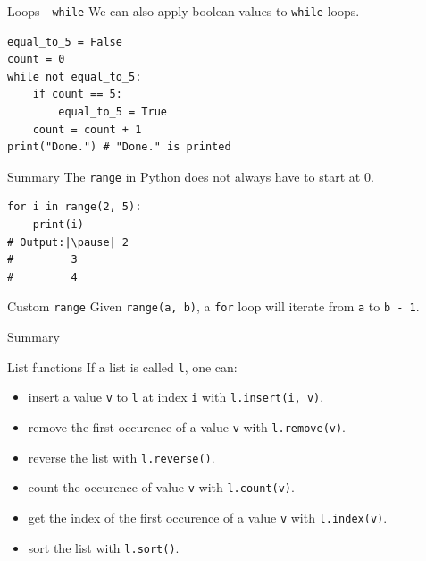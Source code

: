\documentclass[dvipsnames, svgnames, x11names, handout]{beamer}
\begin{document}
\begin{frame}[fragile]{Loops - \texttt{while}}
We can also apply boolean values to \texttt{while} loops.
\begin{verbatim}
equal_to_5 = False
count = 0
while not equal_to_5:
    if count == 5:
        equal_to_5 = True
    count = count + 1
print("Done.") # "Done." is printed
\end{verbatim}
\end{frame}

\begin{frame}[fragile]{Summary}
The \texttt{range} in Python does not always have to start at 0.
\begin{verbatim}
for i in range(2, 5):
    print(i)
# Output:|\pause| 2
#         3
#         4
\end{verbatim}
\begin{block}{Custom \texttt{range}}
Given \texttt{range(a, b)}, a \texttt{for} loop will iterate from \texttt{a} to \texttt{b - 1}.
\end{block}
\end{frame}

\begin{frame}[fragile]{Summary}
\begin{block}{List functions}
If a list is called \texttt{l}, one can:
\begin{itemize}
    \item insert a value \texttt{v} to \texttt{l} at index \texttt{i} with \texttt{l.insert(i, v)}.
    \item remove the first occurence of a value \texttt{v} with \texttt{l.remove(v)}.
    \item reverse the list with \texttt{l.reverse()}.
    \item count the occurence of value \texttt{v} with \texttt{l.count(v)}.
    \item get the index of the first occurence of a value \texttt{v} with \texttt{l.index(v)}.
    \item sort the list with \texttt{l.sort()}.
\end{itemize}
\end{block}

\end{frame}
\end{document}
